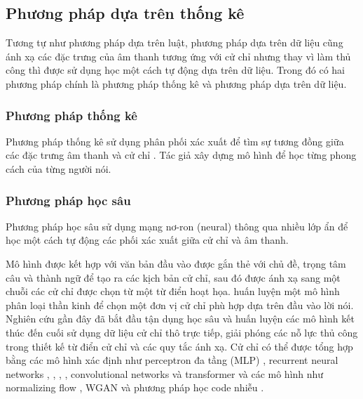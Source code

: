 \subsection{Phương pháp dựa trên thống kê}

Tương tự như phương pháp dựa trên luật, phương pháp dựa trên dữ liệu cũng ánh xạ các đặc trưng của âm thanh tương ứng với cử chỉ nhưng thay vì làm thủ công thì được sử dụng học một cách tự động dựa trên dữ liệu.
Trong đó có hai phương pháp chính là phương pháp thống kê và phương pháp dựa trên dữ liệu.


\subsubsection{Phương pháp thống kê}

Phương pháp thống kê sử dụng phân phối xác xuất để tìm sự tương đồng giữa các đặc trưng âm thanh và cử chỉ \cite{levine2010gesture}. Tác giả \cite{neff2008gesture} xây dựng mô hình để học từng phong cách của từng người nói.

\subsubsection{Phương pháp học sâu}

Phương pháp học sâu sử dụng mạng nơ-ron (neural) thông qua nhiều lớp ẩn để học một cách tự động các phối xác xuất giữa cử chỉ và âm thanh.

Mô hình được kết hợp với văn bản đầu vào được gắn thẻ với chủ đề, trọng tâm câu và thành ngữ để tạo ra các kịch bản cử chỉ, sau đó được ánh xạ sang một chuỗi các cử chỉ được chọn từ một từ điển hoạt họa. \cite{chiu2015predicting} huấn luyện một mô hình phân loại thần kinh để chọn một đơn vị cử chỉ phù hợp dựa trên đầu vào lời nói. Nghiên cứu gần đây đã bắt đầu tận dụng học sâu và huấn luyện các mô hình kết thúc đến cuối sử dụng dữ liệu cử chỉ thô trực tiếp, giải phóng các nỗ lực thủ công trong thiết kế từ điển cử chỉ và các quy tắc ánh xạ. Cử chỉ có thể được tổng hợp bằng các mô hình xác định như perceptron đa tầng (MLP) \cite{kucherenko2020gesticulator}, recurrent neural networks \cite{bhattacharya2021speech2affectivegestures}, \cite{liu2022learning}, \cite{hasegawa2018evaluation}, \cite{yoon2020speech}, convolutional networks \cite{habibie2021learning} và transformer \cite{bhattacharya2021text2gestures} và các mô hình như normalizing flow \cite{alexanderson2020style}, WGAN \cite{wu2021probabilistic} và phương pháp học code nhiễu \cite{xu2022freeform}.

